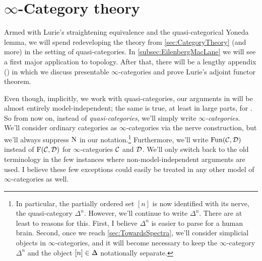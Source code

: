 \section{\texorpdfstring{$\infty$}{Infinity}-Category theory}\label{sec:InftyCategoryTheory}

Armed with Lurie's straightening equivalence and the quasi-categorical Yoneda lemma, we will spend  redeveloping the theory from \cref{sec:CategoryTheory} (and more) in the setting of quasi-categories. In \cref{subsec:EilenbergMacLane} we will see a first major application to topology. After that, there will be a lengthy appendix () in which we discuss presentable $\infty$-categories and prove Lurie's adjoint functor theorem.

Even though, implicitly, we work with quasi-categories, our arguments in  will be almost entirely model-independent; the same is true, at least in large parts, for . So from now on, instead of \emph{quasi-categories}, we'll simply write \emph{$\infty$-categories}. We'll consider ordinary categories as $\infty$-categories via the nerve construction, but we'll always suppress $\operatorname{N}$ in our notation.\footnote{In particular, the partially ordered set $[n]$ is now identified with its nerve, the quasi-category $\Delta^n$. However, we'll continue to write $\Delta^n$. There are at least to reasons for this. First, I believe $\Delta^n$ is easier to parse for a human brain. Second, once we reach \cref{sec:TowardsSpectra}, we'll consider simplicial objects in $\infty$-categories, and it will become necessary to keep the $\infty$-category $\Delta^n$ and the object $[n]\in\IDelta$ notationally separate.} Furthermore, we'll write $\operatorname{Fun}(\mathcal{C},\mathcal{D})$ instead of $\operatorname{F}(\mathcal{C},\mathcal{D})$ for $\infty$-categories $\mathcal{C}$ and $\mathcal{D}$. We'll only switch back to the old terminology in the few instances where non-model-independent arguments are used. I believe these few exceptions could easily be treated in any other model of $\infty$-categories as well.%
%
%

